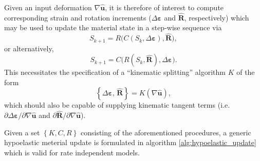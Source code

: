 Given an input deformation $\nabla \hat{\mathbf{u}}$, it is therefore of interest to compute corresponding strain and rotation increments ($\Delta \boldsymbol{\varepsilon}$ and $\hat{\mathbf{R}}$, respectively) which may be used to update the material state in a step-wise sequence via
\begin{equation}
    S_{k+1} = R\big(C(S_k, \Delta \boldsymbol{\varepsilon}), \hat{\mathbf{R}}\big),
\end{equation}
or alternatively,
\begin{equation}
    S_{k+1} = C\big(R(S_k, \hat{\mathbf{R}}), \Delta \boldsymbol{\varepsilon}\big).
\end{equation}
This necessitates the specification of a ``kinematic splitting'' algorithm $K$ of the form
\begin{equation}
    \left\{ \Delta \boldsymbol{\varepsilon}, \, \hat{\mathbf{R}} \right\} = K(\nabla \hat{\mathbf{u}}),
\end{equation}
which should also be capable of supplying kinematic tangent terms (i.e. $\partial \Delta \boldsymbol{\varepsilon} / \partial \nabla \hat{\mathbf{u}}$ and $\partial \hat{\mathbf{R}} / \partial \nabla \hat{\mathbf{u}}$).

Given a set $\left\{ K, C, R \right\}$ consisting of the aforementioned procedures, a generic hypoelastic meterial update is formulated in algorithm \ref{alg:hypoelastic_update} which is valid for rate independent models.

